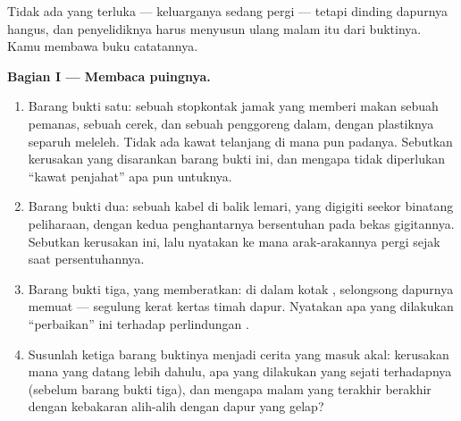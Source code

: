 \begin{problem}\label{pb:g7:short-circuits-safety:1}
Tidak ada yang terluka --- keluarganya sedang pergi --- tetapi dinding
dapurnya hangus, dan penyelidiknya harus menyusun ulang malam itu dari
buktinya. Kamu membawa buku catatannya.

\medskip\noindent\textbf{Bagian I --- Membaca puingnya.}
\begin{enumerate}
  \item Barang bukti satu: sebuah stopkontak jamak yang memberi makan
        sebuah pemanas, sebuah cerek, dan sebuah penggoreng dalam,
        dengan plastiknya separuh meleleh. Tidak ada kawat telanjang
        di mana pun padanya. Sebutkan kerusakan yang disarankan barang
        bukti ini, dan mengapa tidak diperlukan ``kawat penjahat'' apa
        pun untuknya.
  \item Barang bukti dua: sebuah kabel di balik lemari, yang digigiti
        seekor binatang peliharaan, dengan kedua penghantarnya
        bersentuhan pada bekas gigitannya. Sebutkan kerusakan ini,
        lalu nyatakan ke mana arak-arakannya pergi sejak saat
        persentuhannya.
  \item Barang bukti tiga, yang memberatkan: di dalam kotak
        , selongsong   dapurnya memuat ---
        segulung kerat kertas timah dapur. Nyatakan apa yang dilakukan
        ``perbaikan'' ini terhadap perlindungan .
  \item Susunlah ketiga barang buktinya menjadi cerita yang masuk
        akal: kerusakan mana yang datang lebih dahulu, apa yang
        dilakukan  yang sejati terhadapnya (sebelum barang
        bukti tiga), dan mengapa malam yang terakhir berakhir dengan
        kebakaran alih-alih dengan dapur yang gelap?
\end{enumerate}


\end{problem}
